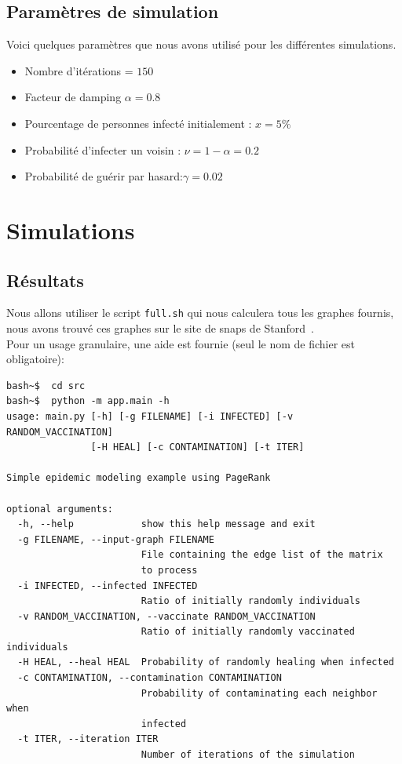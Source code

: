 \documentclass{report}
\begin{document}
\subsection{Paramètres de simulation}
Voici quelques paramètres que nous avons utilisé pour les différentes simulations.
\begin{itemize}[label=$\bullet$]
  \item Nombre d’itérations  = $150$
  \item Facteur de damping $\alpha = 0.8$
  \item Pourcentage de personnes infecté initialement : $x=5\%$
  \item Probabilité d’infecter un voisin : $\nu = 1 - \alpha = 0.2$
  \item Probabilité de guérir par hasard:$\gamma = 0.02$
\end{itemize}
\newpage
\section{Simulations}
\subsection{Résultats}
Nous allons utiliser le script \texttt{full.sh} qui nous calculera tous les graphes fournis,
nous avons trouvé ces graphes sur le site de snaps de Stanford~\cite{snapnets}.\\
Pour un usage granulaire, une aide est fournie (seul le nom de fichier est obligatoire):
\begin{tcolorbox}
  \begin{verbatim}
bash~$  cd src
bash~$  python -m app.main -h
usage: main.py [-h] [-g FILENAME] [-i INFECTED] [-v RANDOM_VACCINATION]
               [-H HEAL] [-c CONTAMINATION] [-t ITER]

Simple epidemic modeling example using PageRank

optional arguments:
  -h, --help            show this help message and exit
  -g FILENAME, --input-graph FILENAME
                        File containing the edge list of the matrix
                        to process
  -i INFECTED, --infected INFECTED
                        Ratio of initially randomly individuals
  -v RANDOM_VACCINATION, --vaccinate RANDOM_VACCINATION
                        Ratio of initially randomly vaccinated individuals
  -H HEAL, --heal HEAL  Probability of randomly healing when infected
  -c CONTAMINATION, --contamination CONTAMINATION
                        Probability of contaminating each neighbor when
                        infected
  -t ITER, --iteration ITER
                        Number of iterations of the simulation
  \end{verbatim}
\end{tcolorbox}
\end{document}
